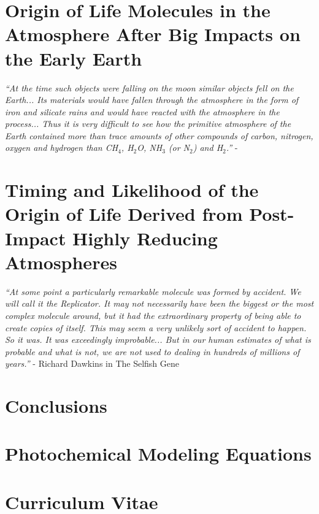 \documentclass[11pt, proquest]{uwthesis}[2016/11/22]
\begin{document}
\chapter{Origin of Life Molecules in the Atmosphere After Big Impacts on the Early Earth} \label{ch:5}
\noindent \emph{``At the time such objects were falling on the moon similar objects fell on the Earth... Its materials would have fallen through the atmosphere in the form of iron and silicate rains and would have reacted with the atmosphere in the process... Thus it is very difficult to see how the primitive atmosphere of the Earth contained more than trace amounts of other compounds of carbon, nitrogen, oxygen and hydrogen than CH$_4$, H$_2$O, NH$_3$ (or N$_2$) and H$_2$.''} - \citet{Urey_1952}
\newpage


\chapter{Timing and Likelihood of the Origin of Life Derived from Post-Impact Highly Reducing Atmospheres} \label{ch:6}
\noindent \emph{``At some point a particularly remarkable molecule was formed by accident. We will call it the Replicator. It may not necessarily have been the biggest or the most complex molecule around, but it had the extraordinary property of being able to create copies of itself. This may seem a very unlikely sort of accident to happen. So it was. It was exceedingly improbable... But in our human estimates of what is probable and what is not, we are not used to dealing in hundreds of millions of years.''} - Richard Dawkins in The Selfish Gene
\newpage


\chapter{Conclusions}
\newpage


\printendnotes

%
%


%
%
\appendix
\raggedbottom\sloppy
 
 
\chapter{Photochemical Modeling Equations}
\newpage


\chapter{Curriculum Vitae}
\newpage

 
\end{document}
